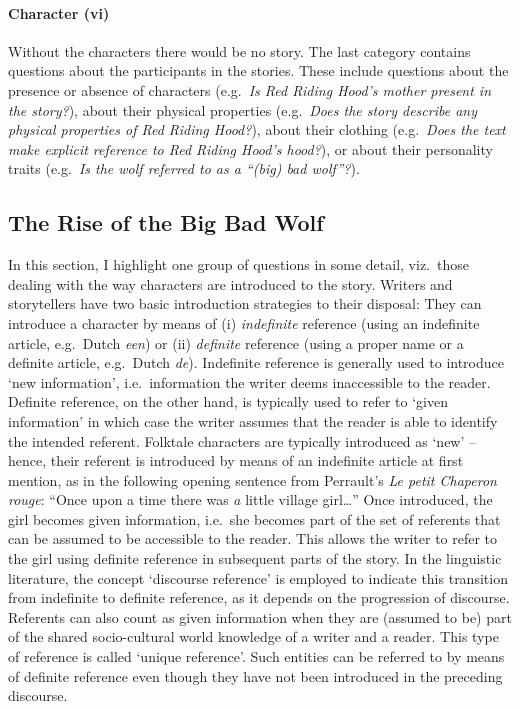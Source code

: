\paragraph{Character (vi)} Without the characters there would be no story. The last category contains questions about the participants in the stories. These include questions about the presence or absence of characters (e.g.\ \emph{Is Red Riding Hood's mother present in the story?}), about their physical properties (e.g.\ \emph{Does the story describe any physical properties of Red Riding Hood?}), about their clothing (e.g.\ \emph{Does the text make explicit reference to Red Riding Hood's hood?}), or about their personality traits (e.g.\ \emph{Is the wolf referred to as a ``(big) bad wolf''?}). 

\subsection{The Rise of the Big Bad Wolf}
In this section, I highlight one group of questions in some detail, viz.\ those dealing with the way characters are introduced to the story. Writers and storytellers have two basic introduction strategies to their disposal: They can introduce a character by means of (i) \emph{indefinite} reference (using an indefinite article, e.g.\ Dutch \emph{een}) or (ii) \emph{definite} reference (using a proper name or a definite article, e.g.\ Dutch \emph{de}).\autocite[See e.g.][]{deJong:1987,lyons:1999,radden:2007} Indefinite reference is generally used to introduce `new information', i.e.\ information the writer deems inaccessible to the reader. Definite reference, on the other hand, is typically used to refer to `given information' in which case the writer assumes that the reader is able to identify the intended referent. Folktale characters are typically introduced as `new' -- hence, their referent is introduced by means of an indefinite article at first mention, as in the following opening sentence from Perrault's \emph{Le petit Chaperon rouge}: ``Once upon a time there was \emph{a} little village girl\ldots'' Once introduced, the girl becomes given information, i.e.\ she becomes part of the set of referents that can be assumed to be accessible to the reader. This allows the writer to refer to the girl using definite reference in subsequent parts of the story. In the linguistic literature, the concept `discourse reference' is employed to indicate this transition from indefinite to definite reference, as it depends on the progression of discourse\autocite[98]{radden:2007}. Referents can also count as given information when they are (assumed to be) part of the shared socio-cultural world knowledge of a writer and a reader. This type of reference is called `unique reference'\autocite[99]{radden:2007}. Such entities can be referred to by means of definite reference even though they have not been introduced in the preceding discourse. 

